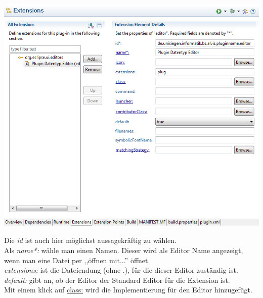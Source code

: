 \documentclass[10pt,a4paper]{article}
\begin{document}
\begin{center}
\includegraphics[scale=0.625]{images/new_plugin_editor_00}
\end{center}

Die \emph{id} ist auch hier möglichst aussagekräftig zu wählen.\\
Als \emph{name*:} wähle man einen Namen. Dieser wird als Editor Name angezeigt, wenn man eine Datei per ,,öffnen mit...'' öffnet.\\
\emph{extensions:} ist die Dateiendung (ohne .), für die dieser Editor zuständig ist.\\
\emph{default:} gibt an, ob der Editor der Standard Editor für die Extension ist.\\


Mit einem klick auf \underline{class:} wird die Implementierung für den Editor hinzugefügt.
\end{document}
